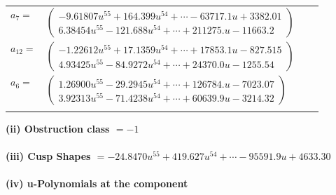 \documentclass[1p]{elsarticle_modified}
\theoremstyle{definition}
\begin{document}
\begin{tabular}{m{7pt} m{180pt} m{7pt} m{180pt} }
\flushright $a_{7}=$&$\begin{pmatrix}-9.61807 u^{55}+164.399 u^{54}+\cdots-63717.1 u+3382.01\\6.38454 u^{55}-121.688 u^{54}+\cdots+211275. u-11663.2\end{pmatrix}$ \\
\flushright $a_{12}=$&$\begin{pmatrix}-1.22612 u^{55}+17.1359 u^{54}+\cdots+17853.1 u-827.515\\4.93425 u^{55}-84.9272 u^{54}+\cdots+24370.0 u-1255.54\end{pmatrix}$ \\
\flushright $a_{6}=$&$\begin{pmatrix}1.26900 u^{55}-29.2945 u^{54}+\cdots+126784. u-7023.07\\3.92313 u^{55}-71.4238 u^{54}+\cdots+60639.9 u-3214.32\end{pmatrix}$\\&\end{tabular}
\flushleft \textbf{(ii) Obstruction class $= -1$}\\~\\
\flushleft \textbf{(iii) Cusp Shapes $= -24.8470 u^{55}+419.627 u^{54}+\cdots-95591.9 u+4633.30$}\\~\\
\newpage\renewcommand{\arraystretch}{1}
\flushleft \textbf{(iv) u-Polynomials at the component}\newline \\
\end{document}
